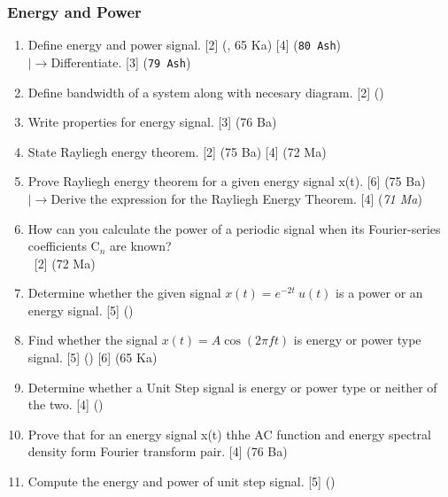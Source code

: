 \documentclass[12pt]{article}
\newcommand{\lb}{\\$\left|\rightarrow\right.$}
\newcommand{\enter}{\\\textcolor{white}{1}}
\begin{document}
    \subsubsection{Energy and Power}
      \begin{enumerate}
        \item Define energy and power signal. \hfill [2] (, 65 Ka) [4] (\texttt{80 Ash})
          \lb Differentiate. \hfill [3] (\texttt{79 Ash})

        \item Define bandwidth of a system along with necesary diagram. \hfill [2] ()

        \item Write properties for energy signal. \hfill [3] (76 Ba)

        \item State Rayliegh energy theorem. \hfill [2] (75 Ba) [4] (72 Ma)

        \item Prove Rayliegh energy theorem for a given energy signal x(t). \hfill [6] (75 Ba)
        \lb Derive the expression for the Rayliegh Energy Theorem. \hfill [4] (\textit{71 Ma})

        \item How can you calculate the power of a periodic signal when its Fourier-series coefficients C$_n$ are known?
        \enter\hfill [2] (72 Ma)

        \item Determine whether the given signal $x(t) = e^{-2t}\ u(t)$ is a power or an energy signal. \hfill [5] ()

        \item Find whether the signal $x(t) = A \cos(2\pi ft)$ is energy or power type signal. \hfill [5] () [6] (65 Ka)

        \item Determine whether a Unit Step signal is energy or power type or neither of the two. \hfill [4] ()

        \item Prove that for an energy signal x(t) thhe AC function and energy spectral density form Fourier transform pair. \hfill [4] (76 Ba)

        \item Compute the energy and power of unit step signal. \hfill [5] ()
      \end{enumerate}
\end{document}

